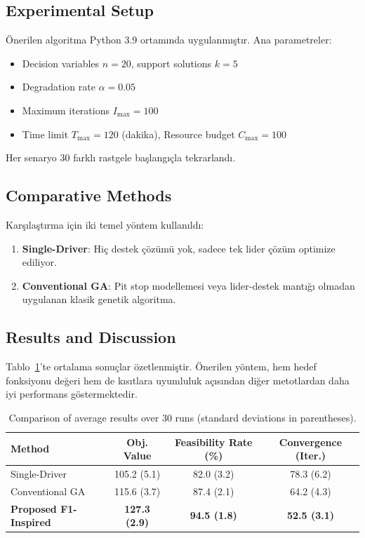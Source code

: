\documentclass[preprint,12pt]{elsarticle}
\begin{document}
\subsection{Experimental Setup}
Önerilen algoritma Python 3.9 ortamında uygulanmıştır. Ana parametreler:
\begin{itemize}
    \item Decision variables $n = 20$, support solutions $k = 5$
    \item Degradation rate $\alpha = 0.05$
    \item Maximum iterations $I_{\max} = 100$
    \item Time limit $T_{\max} = 120$ (dakika), Resource budget $C_{\max} = 100$
\end{itemize}
Her senaryo 30 farklı rastgele başlangıçla tekrarlandı.

\subsection{Comparative Methods}
Karşılaştırma için iki temel yöntem kullanıldı:
\begin{enumerate}
    \item \textbf{Single-Driver}: Hiç destek çözümü yok, sadece tek lider çözüm optimize ediliyor.
    \item \textbf{Conventional GA}: Pit stop modellemesi veya lider-destek mantığı olmadan uygulanan klasik genetik algoritma.
\end{enumerate}

\subsection{Results and Discussion}
Tablo~\ref{tab:results}’te ortalama sonuçlar özetlenmiştir. Önerilen yöntem, hem hedef fonksiyonu değeri hem de kısıtlara uyumluluk açısından diğer metotlardan daha iyi performans göstermektedir.

\begin{table}[!ht]
\centering
\caption{Comparison of average results over 30 runs (standard deviations in parentheses).}
\label{tab:results}
\begin{tabular}{lccc}
\toprule
\textbf{Method} & \textbf{Obj. Value} & \textbf{Feasibility Rate (\%)} & \textbf{Convergence (Iter.)}\\
\midrule
Single-Driver & 105.2 (5.1) & 82.0 (3.2) & 78.3 (6.2) \\
Conventional GA & 115.6 (3.7) & 87.4 (2.1) & 64.2 (4.3) \\
\textbf{Proposed F1-Inspired} & \textbf{127.3 (2.9)} & \textbf{94.5 (1.8)} & \textbf{52.5 (3.1)} \\
\bottomrule
\end{tabular}
\end{table}
\end{document}
